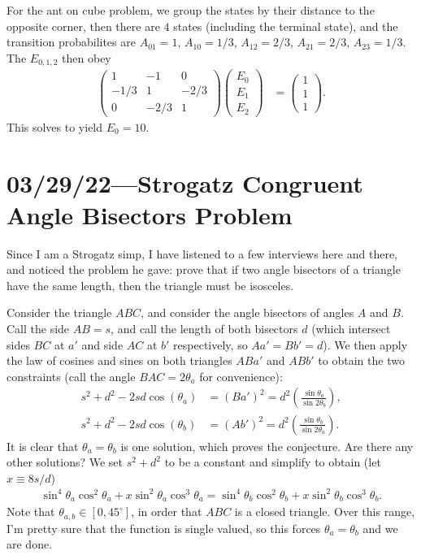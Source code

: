 \documentclass[12pt]{report}
\newcommand*{\p}[1]{\left(#1\right)}
\newcommand*{\s}[1]{\left[#1\right]}
\DeclareMathOperator{\E}{E}
\begin{document}
For the ant on cube problem, we group the states by their distance to the
opposite corner, then there are $4$ states (including the terminal state), and
the transition probabilites are $A_{01} = 1$, $A_{10} = 1/3$, $A_{12} = 2/3$,
$A_{21} = 2/3$, $A_{23} = 1/3$. The $E_{0,1,2}$ then obey
\begin{align}
    \begin{pmatrix}
        1 & -1 & 0\\
        -1/3 & 1 & -2/3\\
        0 & -2/3 & 1
    \end{pmatrix}\begin{pmatrix}
        E_0 \\E_1\\E_2
    \end{pmatrix} &= \begin{pmatrix}
        1\\1\\1
    \end{pmatrix}.
\end{align}
This solves to yield $E_0 = 10$.

\chapter{03/29/22---Strogatz Congruent Angle Bisectors Problem}

Since I am a Strogatz simp, I have listened to a few interviews here and there,
and noticed the problem he gave: prove that if two angle bisectors of a triangle
have the same length, then the triangle must be isosceles.

Consider the triangle $ABC$, and consider the angle bisectors of angles $A$ and
$B$. Call the side $AB = s$, and call the length of both bisectors $d$ (which
intersect sides $BC$ at $a'$ and side $AC$ at $b'$ respectively, so $Aa' = Bb' =
d$). We then apply the law of cosines and sines on both triangles $ABa'$ and
$ABb'$ to obtain the two constraints (call the angle $BAC = 2\theta_a$ for
convenience):
\begin{align}
    s^2 + d^2 - 2sd\cos\p{\theta_a} &= (Ba')^2 =
        d^2\p{\frac{\sin \theta_a}{\sin 2\theta_b}},\\
    s^2 + d^2 - 2sd\cos\p{\theta_b} &= (Ab')^2 =
        d^2\p{\frac{\sin \theta_b}{\sin 2\theta_a}}.
\end{align}
It is clear that $\theta_a = \theta_b$ is one solution, which proves the
conjecture. Are there any other solutions? We set $s^2 + d^2$ to be a constant
and simplify to obtain (let $x \equiv 8s/d$)
\begin{align}
    \sin^4 \theta_a \cos^2 \theta_a + x\sin^2\theta_a \cos^3 \theta_a
    = \sin^4 \theta_b \cos^2 \theta_b + x\sin^2\theta_b \cos^3 \theta_b.
\end{align}
Note that $\theta_{a, b} \in \s{0, 45^\circ}$, in order that $ABC$ is a closed
triangle. Over this range, I'm pretty sure that the function is single valued,
so this forces $\theta_a = \theta_b$ and we are done.
\end{document}
